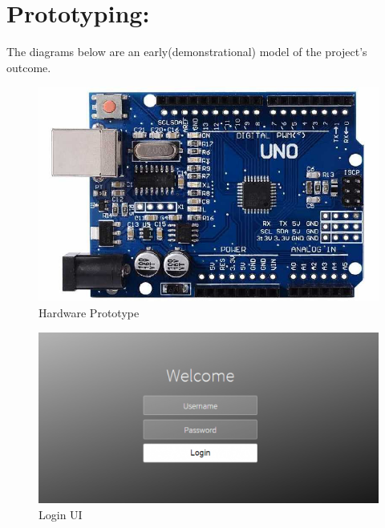 \documentclass[12pt,a4paper,final]{report}
\begin{document}
\section{Prototyping:}
The diagrams below are an early(demonstrational) model of the project's outcome.
	\begin{figure}[!h]
		\begin{center}
			\includegraphics[scale=0.4]{UnoR3.jpg}
		\end{center}
		\caption{Hardware Prototype}
	\end{figure}
	\begin{figure}[!h]
		\begin{center}
			\includegraphics[scale=0.8]{Login.png}
		\end{center}
		\caption{Login UI}
	\end{figure}
	
	\newpage
	
\end{document}
